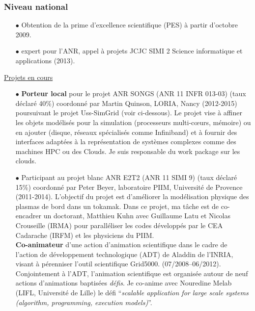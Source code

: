 \documentclass[11pt]{article}
\begin{document}
\subsubsection{Niveau national}
\begin{itemize}

\item[$\bullet$] Obtention de la prime d'excellence scientifique (PES) à partir d'octobre 2009.\\

\item [$\bullet$]
expert pour l'ANR, appel à projets JCJC SIMI 2 Science informatique et applications (2013).\\
\end{itemize}

\underline{Projets en cours}\\
\begin{itemize}

\item[$\bullet$]
\textbf{Porteur local} pour le projet ANR SONGS (ANR 11 INFR 013-03)  (taux déclaré 40\%)
coordonné par Martin Quinson, LORIA, Nancy (2012-2015)  poursuivant le projet 
Uss-SimGrid (voir ci-dessous). Le projet vise à affiner les objets modélisés pour la 
simulation (processeurs multi-c{\oe}urs, mémoire) ou en ajouter (disque, réseaux spécialisés
comme Infiniband) et à fournir des interfaces adaptées à la représentation de systèmes
complexes comme des machines HPC ou des Clouds. Je suis responsable du work package
sur les clouds.\\

\item[$\bullet$]
Participant au projet blanc ANR E2T2 (ANR 11 SIMI 9) (taux déclaré 15\%) coordonné par 
Peter Beyer, laboratoire PIIM, Université de Provence (2011-2014). L'objectif du projet 
est d'améliorer la modélisation physique des plasmas de bord dans un tokamak. Dans ce
projet, ma tâche est de co-encadrer un doctorant, Matthieu Kuhn avec Guillaume Latu et
Nicolas Crouseille (IRMA) pour paralléliser les codes développés par le CEA Cadarache 
(IRFM) et les physiciens du PIIM. \\

\textbf{Co-animateur} d'une action d'animation scientifique 
dans le cadre de l'action de développement technologique (ADT) de Aladdin de l'INRIA, 
visant à pérenniser l'outil scientifique Grid5000. (07/2008--06/2012). 
Conjointement à l'ADT, l'animation scientifique est organisée autour de neuf actions d'animations baptisées \emph{défis}.
Je co-anime avec Nouredine Melab (LIFL, Université de Lille) le défi 
``{\em scalable application for large scale systems (algorithm, programming, execution models)}''.\\
\end{itemize}
\end{document}
